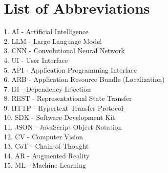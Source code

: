 \chapter*{List of Abbreviations}

\begin{abbreviations}
 1. AI   - Artificial Intelligence \\
 2. LLM  - Large Language Model \\
 3. CNN  - Convolutional Neural Network \\
 4. UI   - User Interface \\
 5. API  - Application Programming Interface \\
 6. ARB  - Application Resource Bundle (Localization) \\
 7. DI   - Dependency Injection \\
 8. REST - Representational State Transfer \\
 9. HTTP - Hypertext Transfer Protocol \\
 10. SDK  - Software Development Kit \\
 11. JSON - JavaScript Object Notation \\
 12. CV   - Computer Vision \\
 13. CoT  - Chain-of-Thought \\
 14. AR   - Augmented Reality \\
 15. ML   - Machine Learning
\end{abbreviations}
